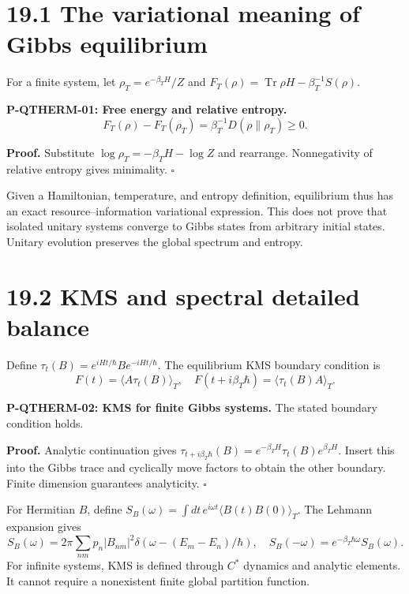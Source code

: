 \documentclass[
  11pt,
  oneside]{book}
\begin{document}
\section{19.1 The variational meaning of Gibbs equilibrium}

For a finite system, let \(\rho_T=e^{-\beta_TH}/Z\) and
\(F_T(\rho)=\operatorname{Tr}\rho H-\beta_T^{-1}S(\rho)\).

\label{p-qtherm-01}{}

\textbf{P-QTHERM-01: Free energy and relative entropy.} \[
F_T(\rho)-F_T(\rho_T)
=\beta_T^{-1}D(\rho\|\rho_T)\ge0.
\]

\textbf{Proof.} Substitute \(\log\rho_T=-\beta_TH-\log Z\) and
rearrange. Nonnegativity of relative entropy gives minimality.
\(\square\)

Given a Hamiltonian, temperature, and entropy definition, equilibrium
thus has an exact resource--information variational expression. This
does not prove that isolated unitary systems converge to Gibbs states
from arbitrary initial states. Unitary evolution preserves the global
spectrum and entropy.

\section{19.2 KMS and spectral detailed balance}

Define \(\tau_t(B)=e^{iHt/\hbar}Be^{-iHt/\hbar}\). The equilibrium KMS
boundary condition is \[
F(t)=\langle A\tau_t(B)\rangle_T,\quad
F(t+i\beta_T\hbar)=\langle\tau_t(B)A\rangle_T.
\]

\label{p-qtherm-02}{}

\textbf{P-QTHERM-02: KMS for finite Gibbs systems.} The stated boundary
condition holds.

\textbf{Proof.} Analytic continuation gives \(\tau_{t+i\beta_T\hbar}(B)=
e^{-\beta_TH}\tau_t(B)e^{\beta_TH}\). Insert this into the Gibbs trace
and cyclically move factors to obtain the other boundary. Finite
dimension guarantees analyticity. \(\square\)

For Hermitian \(B\), define
\(S_B(\omega)=\int dt\,e^{i\omega t}\langle B(t)B(0)\rangle_T\). The
Lehmann expansion gives \[
S_B(\omega)=2\pi\sum_{nm}p_n|B_{nm}|^2
\delta(\omega-(E_m-E_n)/\hbar),
\quad S_B(-\omega)=e^{-\beta_T\hbar\omega}S_B(\omega).
\] For infinite systems, KMS is defined through \(C^*\) dynamics and
analytic elements. It cannot require a nonexistent finite global
partition function.
\end{document}
